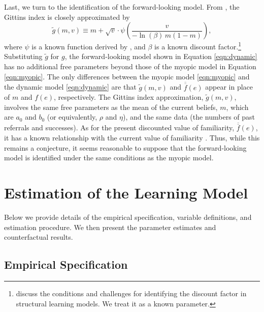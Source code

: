 \documentclass[12pt]{article}
\begin{document}
Last, we turn to the identification of the forward-looking model. From \cite{brezzi2002}, the Gittins index is closely approximated by 
\begin{equation}
\tilde g(m,v) \equiv    m + \sqrt{v} \cdot \psi \left( \frac{v}{-\ln(\beta) \, m (1-m)} \right),
\label{eqn:gittins_approx}    
\end{equation}
where $\psi$ is a known function derived by \cite{brezzi2002}, and $\beta$ is a known discount factor.\footnote{\cite{ching2013} discuss the conditions and challenges for identifying the discount factor in structural learning models. We treat it as a known parameter.} Substituting $\tilde g$ for $g$, the forward-looking model shown in Equation \eqref{eqn:dynamic} has no additional free parameters beyond those of the myopic model in Equation \eqref{eqn:myopic}. The only differences between the myopic model \eqref{eqn:myopic} and the dynamic model \eqref{eqn:dynamic} are that $\tilde g(m,v)$ and $\overline{\overline{f}}(e)$ appear in place of $m$ and $f(e)$, respectively. The Gittins index approximation, $\tilde g(m,v)$, involves the same free parameters as the mean of the current beliefs, $m$, which are $a_0$ and $b_0$ (or equivalently, $\rho$ and $\eta$), and the same data (the numbers of past referrals and successes). As for the present discounted value of familiarity, $\overline{\overline{f}}(e)$, it has a known relationship with the current value of familiarity \citep[see][for an equivalent result applied to an effect of learning by doing]{gong2018}. Thus, while this remains a conjecture, it seems reasonable to suppose that the forward-looking model is identified under the same conditions as the myopic model.



\section{Estimation of the Learning Model}
\label{sec:structural}

Below we provide details of the empirical specification, variable definitions, and estimation procedure. We then present the parameter estimates and counterfactual results.

\subsection{Empirical Specification}
\label{sec:emp-specification}
\end{document}
